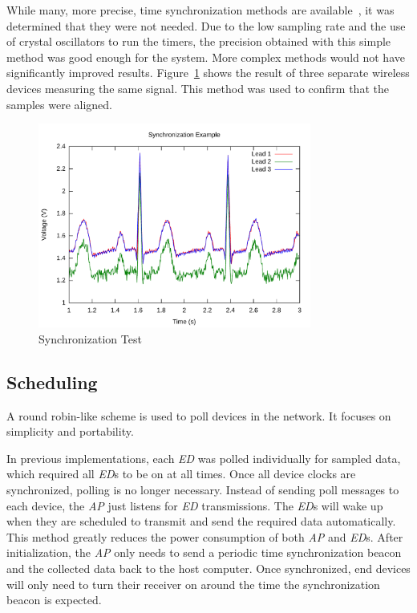 \documentclass{article}
\begin{document}
While many, more precise, time synchronization methods are available~\cite{synchronization:FTSP}, it was determined that they were not needed. Due to the low sampling rate and the use of crystal oscillators to run the timers, the precision obtained with this simple method was good enough for the system. More complex methods would not have significantly improved results. Figure~\ref{fig:sync_data} shows the result of three separate wireless devices measuring the same signal. This method was used to confirm that the samples were aligned.

\begin{figure}[htb]
\begin{center}
\includegraphics[width=0.8\textwidth]{figures/syncdata.pdf}
\end{center}
\caption{Synchronization Test}
\label{fig:sync_data}
\end{figure}

\subsection{Scheduling}
A round robin-like scheme is used to poll devices in the network. It focuses on simplicity and portability.

In previous implementations, each \emph{ED} was polled individually for sampled data, which required all \emph{ED}s to be on at all times. Once all device clocks are synchronized, polling is no longer necessary. Instead of sending poll messages to each device, the \emph{AP} just listens for \emph{ED} transmissions. The \emph{ED}s will wake up when they are scheduled to transmit and send the required data automatically. This method greatly reduces the power consumption of both \emph{AP} and \emph{ED}s. After initialization, the \emph{AP} only needs to send a periodic time synchronization beacon and the collected data back to the host computer. Once synchronized, end devices will only need to turn their receiver on around the time the synchronization beacon is expected.
\end{document}
